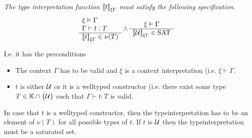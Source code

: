 \begin{definition}
    \label{SpecificationTypeInterpretation}
    \emph{The type interpretation function ${{[\![} t{]\!]}}_{\xi\Gamma}$ must
    satisfy the following specification}.
    $$
    \begin{array}{l} 
        \xi \vDash \Gamma
        \\
        \Gamma \vdash t : T
     \\ \hline 
        {{[\![}t{]\!]}}_{\xi\Gamma} \in \nu(T)
    \end{array}
    \land
    \begin{array}{c} 
        \xi \vDash \Gamma
     \\ \hline 
        {{[\![}{\cal U}{]\!]}}_{\xi\Gamma} \in \text{SAT}
    \end{array}
    $$

    I.e. it has the preconditions
    \begin{itemize}
    \item The context $\Gamma$ has to be valid and $\xi$ is a context
        interpretation (i.e. $\xi \vdash \Gamma$.

    \item $t$ is either ${\cal U}$ or it is a welltyped constructor (i.e. there
        exist some type $T \in \mathbb{K} \cap {\{{\cal U}\}}$ such that $\Gamma \vdash
            t : T$ is
    valid.
    \end{itemize}

    In case that $t$ is a welltyped constructor, then the typeinterpretation has
    to be an element of $\nu(T)$ for all possible types of $t$. If $t$ is ${\cal U}$
    then the typeinterpretation must be a saturated set.
\end{definition}


